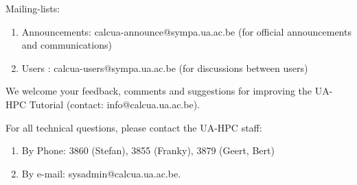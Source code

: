 Mailing-lists:

\begin{enumerate}
\item  Announcements: calcua-announce@sympa.ua.ac.be (for official announcements and communications)
\item  Users : calcua-users@sympa.ua.ac.be (for discussions between users)
\end{enumerate}


We welcome your feedback, comments and suggestions for improving the UA-HPC
Tutorial  (contact: info@calcua.ua.ac.be).


For all technical questions, please contact the UA-HPC staff:

\begin{enumerate}
\item  By Phone: 3860 (Stefan), 3855 (Franky), 3879 (Geert, Bert)
\item  By e-mail:  sysadmin@calcua.ua.ac.be.
\end{enumerate}
